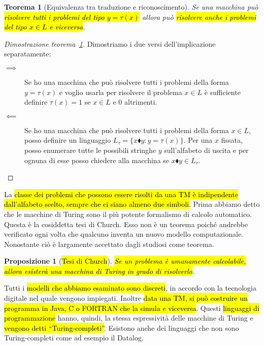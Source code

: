\documentclass[a4paper,11pt,oneside]{article}
\theoremstyle{plain}
\newtheorem{prop}{Proposizione}[section]
\newtheorem{thm}{Teorema}[section]
\theoremstyle{definition}
\theoremstyle{remark}
\newcommand*{\termsep}[0]{\blacklozenge}
\begin{document}
\begin{thm}[Equivalenza tra traduzione e riconoscimento]\label{thm:equiv-trad-ric}
  Se una macchina può \hl{risolvere tutti i problemi del tipo $y = \tau(x)$}
  allora può \hl{risolvere anche i problemi del tipo $x \in L$ e viceversa}.
\end{thm}
\begin{proof}[Dimostrazione teorema~\ref{thm:equiv-trad-ric}]
  Dimostriamo i due versi dell'implicazione separatamente:

  \begin{description}
    \item[$\implies$] Se ho una macchina che può risolvere tutti i problemi
      della forma $y = \tau (x)$ e voglio usarla per risolvere il problema $x
      \in L$ è sufficiente definire $\tau(x) = 1$ se $x \in L$ e $0$ altrimenti.
    \item[$\impliedby$] Se ho una macchina che può risolvere tutti i problemi
      della forma $x \in L$, posso definire un linguaggio $L_{\tau} = \{
      x\termsep y : y = \tau(x) \}$. Per una $x$ fissata, posso enumerare
      tutte le possibili stringhe $y$ sull'alfabeto di uscita e per ognuna di
      esse posso chiedere alla macchina se $x\termsep y \in L_{\tau}$.
  \end{description}
\end{proof}

La \hl{classe dei problemi che possono essere risolti da una TM è indipendente
dall'alfabeto scelto, sempre che ci siano almeno due simboli}. Prima abbiamo
detto che le macchine di Turing sono il più potente formalismo di calcolo
automatico. Questa è la cosiddetta tesi di Church. Esso non è un teorema poiché
andrebbe verificato ogni volta che qualcuno inventa un nuovo modello
computazionale. Nonostante ciò è largamente accettato dagli studiosi come
teorema.

\begin{prop}[\hl{Tesi di Church}]\label{thm:tesi-church-1}
  \hl{Se un problema è umanamente calcolabile, allora esisterà una macchina di
  Turing in grado di risolverlo}.
\end{prop}

Tutti i \hl{modelli che abbiamo esaminato sono discreti}, in accordo con la
tecnologia digitale nel quale vengono impiegati. Inoltre \hl{data una TM, si può
costruire un programma in Java, C o FORTRAN che la simula e viceversa}. Questi
\hl{linguaggi di programmazione} hanno, quindi, la stessa espressività delle
macchine di Turing e \hl{vengono detti ``Turing-completi''}. Esistono anche dei
linguaggi che non sono Turing-completi come ad esempio il Datalog.
\end{document}
